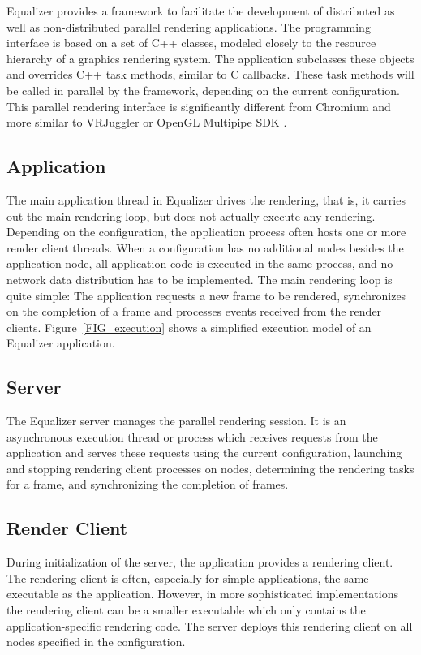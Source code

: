 Equalizer provides a framework to facilitate the development of distributed as
well as non-distributed parallel rendering applications. The programming
interface is based on a set of C++ classes, modeled closely to the resource
hierarchy of a graphics rendering system. The application subclasses these
objects and overrides C++ task methods, similar to C callbacks. These task
methods will be called in parallel by the framework, depending on the current
configuration. This parallel rendering interface is significantly different from
Chromium \cite{HHNFAKK:02} and more similar to VRJuggler \cite{BJHMBC:01} or
OpenGL Multipipe SDK \cite{BRE:05}.

\subsection{Application}

The main application thread in Equalizer drives the rendering, that is, it
carries out the main rendering loop, but does not actually execute any
rendering. Depending on the configuration, the application process often hosts
one or more render client threads. When a configuration has no additional nodes
besides the application node, all application code is executed in the same
process, and no network data distribution has to be implemented. The main
rendering loop is quite simple: The application requests a new frame to be
rendered, synchronizes on the completion of a frame and processes events
received from the render clients. Figure~\ref{FIG_execution} shows a simplified
execution model of an Equalizer application.


\subsection{Server}

The Equalizer server manages the parallel rendering session. It is an
asynchronous execution thread or process which receives requests from the
application and serves these requests using the current configuration, launching
and stopping rendering client processes on nodes, determining the rendering
tasks for a frame, and synchronizing the completion of frames.

\subsection{Render Client}

During initialization of the server, the application provides a rendering
client. The rendering client is often, especially for simple applications, the
same executable as the application. However, in more sophisticated
implementations the rendering client can be a smaller executable which only contains
the application-specific rendering code. The server deploys this rendering
client on all nodes specified in the configuration.

